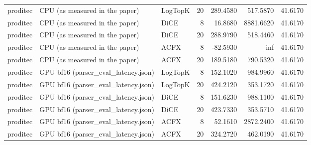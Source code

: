 \begin{tabular}{lllrrrr}
proditec &      CPU (as measured in the paper) & LogTopK &              20 &            289.4580 &                 517.5870 &             41.6170 \\
proditec &      CPU (as measured in the paper) &    DiCE &               8 &             16.8680 &                8881.6620 &             41.6170 \\
proditec &      CPU (as measured in the paper) &    DiCE &              20 &            288.9790 &                 518.4460 &             41.6170 \\
proditec &      CPU (as measured in the paper) &    ACFX &               8 &            -82.5930 &                      inf &             41.6170 \\
proditec &      CPU (as measured in the paper) &    ACFX &              20 &            189.5180 &                 790.5320 &             41.6170 \\
proditec & GPU bf16 (parser\_eval\_latency.json) & LogTopK &               8 &            152.1020 &                 984.9960 &             41.6170 \\
proditec & GPU bf16 (parser\_eval\_latency.json) & LogTopK &              20 &            424.2120 &                 353.1720 &             41.6170 \\
proditec & GPU bf16 (parser\_eval\_latency.json) &    DiCE &               8 &            151.6230 &                 988.1100 &             41.6170 \\
proditec & GPU bf16 (parser\_eval\_latency.json) &    DiCE &              20 &            423.7330 &                 353.5710 &             41.6170 \\
proditec & GPU bf16 (parser\_eval\_latency.json) &    ACFX &               8 &             52.1610 &                2872.2400 &             41.6170 \\
proditec & GPU bf16 (parser\_eval\_latency.json) &    ACFX &              20 &            324.2720 &                 462.0190 &             41.6170 \\
\bottomrule
\end{tabular}
